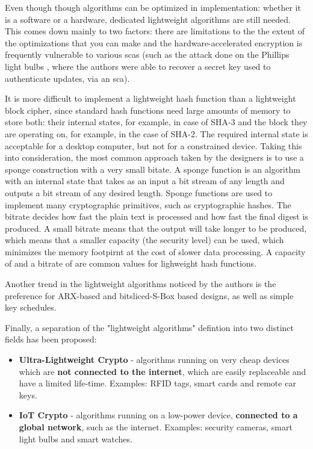 \documentclass{llncs}
\begin{document}
Even though though algorithms can be optimized in implementation: whether it is
a software or a hardware, dedicated lightweight algorithms are still needed.
This comes down mainly to two factors: there are limitations to the the extent of
the optimizations that you can make and the hardware-accelerated encryption is
frequently vulnerable to various \gls{sca}s (such as the attack done on the
Phillips light bulbs \cite{cryptoeprint:2016:1047}, where the authors were able to
recover a secret key used to authenticate updates, via an \gls{sca}).

It is more difficult to implement a lightweight hash function than a lightweight
block cipher, since standard hash functions need large amounts
of memory to store both: their internal states, for example,  in case of SHA-3
and the block they are operating on, for example,  in the case of SHA-2.
The required internal state is acceptable for a desktop computer, but not for a
constrained device. Taking this into consideration, the most common approach
taken by the designers is to use a sponge construction with a very small bitate.
A sponge function is an algorithm with an internal state that takes as an input
a bit stream of any length and outputs a bit stream of any desired length. Sponge
functions are used to implement many cryptographic primitives, such as cryptographic
hashes. The bitrate decides how fast the plain text is processed and how fast the
final digest is produced. A small bitrate means that the output will take longer
to be produced, which means that a smaller capacity (the security level)
can be used, which minimizes the memory footpirnt at the cost of slower data
processing. A capacity of  and a bitrate of 
are common values for lighweight hash functions.

Another trend in the lightweight algorithms noticed by the authors is the
preference for ARX-based and bitsliced-S-Box based designs, as well as simple
key schedules.

Finally, a separation of the "lightweight algorithms" defintion into two
distinct fields has been proposed:

\begin{itemize}
  \item \textbf{Ultra-Lightweight Crypto} - algorithms running on very cheap
  devices which are \textbf{not connected to the internet}, which are easily replaceable
  and have a limited life-time. Examples: RFID tags, smart cards and remote car keys.
  \item \textbf{IoT Crypto} - algorithms running on a low-power device,
  \textbf{connected to a global network}, such as the internet. Examples: security cameras,
  smart light bulbs and smart watches.
\end{itemize}
\end{document}
